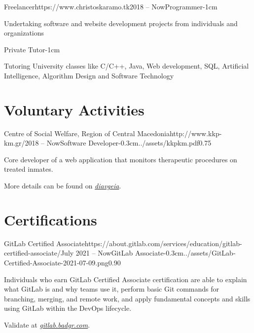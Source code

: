 \documentclass{mycv}
\begin{document}
	\begin{EntryDated}{Freelancer}{https://www.christoskaramo.tk}{2018 -- Now}{Programmer}{-1cm}
	\begin{Itemize}
		\item Undertaking software and website development projects from individuals and organizations
	\end{Itemize}
	\end{EntryDated}

	\vspace*{-1.2cm}

	\begin{EntryDated}{}{}{}{Private Tutor}{-1cm}
		\begin{Itemize}
			\item Tutoring University classes like C/C++, Java, Web development, SQL, Artificial Intelligence, Algorithm Design and Software Technology
		\end{Itemize}
	\end{EntryDated}
	
	\section{Voluntary Activities}
	\begin{EntryDatedLogo}{Centre of Social Welfare, Region of Central Macedonia}{http://www.kkp-km.gr/}{2018 -- Now}{Software Developer}{-0.3cm}{../assets/kkpkm.pdf}{0.75}
		\begin{Itemize}
			\item Core developer of a web application that monitors therapeutic procedures on treated inmates.
			\item More details can be found on \href{https://diavgeia.gov.gr/decision/view/\%CE\%A8\%CE\%A6\%CE\%A1\%CE\%93\%CE\%9F\%CE\%9E\%CE\%A7\%CE\%A3-\%CE\%A0\%CE\%93\%CE\%A6}{\textit{diavgeia}}.
		\end{Itemize}
	\end{EntryDatedLogo}

	\section{Certifications}
    \begin{EntryDatedLogo}{GitLab Certified Associate}{https://about.gitlab.com/services/education/gitlab-certified-associate/}{July 2021 -- Now}{GitLab Associate}{-0.3cm}{../assets/GitLab-Certified-Associate-2021-07-09.png}{0.90}
		\begin{Itemize}
			\item Individuals who earn GitLab Certified Associate certification are able to explain what GitLab is and why teams use it, perform basic Git commands for branching, merging, and remote work, and apply fundamental concepts and skills using GitLab within the DevOps lifecycle. 
			\item Validate at \href{https://gitlab.badgr.com/public/assertions/Hw6j8Th9SyKNj8ehsQkqAw}{\textit{gitlab.badgr.com}}.
		\end{Itemize}
	\end{EntryDatedLogo}
	
\end{document}
